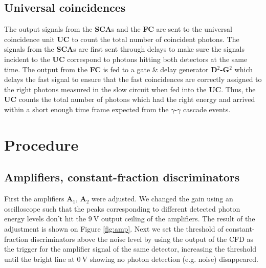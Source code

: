 \documentclass[twocolumn]{article}
\begin{document}
\subsection{Universal coincidences}
The output signals from the \textbf{SCA}s and the \textbf{FC} are sent to the universal coincidence unit \textbf{UC} to count the total number of coincident photons. The signals from the \textbf{SCA}s are first sent through delays to make sure the signals incident to the \textbf{UC} correspond to photons hitting both detectors at the same time. The output from the \textbf{FC} is fed to a gate $\&$ delay generator \textbf{D$^2$-G$^2$} which delays the fast signal to ensure that the fast coincidences are correctly assigned to the right photons measured in the slow circuit when fed into the \textbf{UC}. Thus, the \textbf{UC} counts the total number of photons which had the right energy and arrived within a short enough time frame expected from the $\gamma$-$\gamma$ cascade events.


\section{Procedure}
\subsection{Amplifiers, constant-fraction discriminators}
First the amplifiers \textbf{A$_1$}, \textbf{A$_2$} were adjusted. We changed the gain using an oscilloscope such that the peaks corresponding to different detected photon energy levels don't hit the $\SI{9}{\volt}$ output ceiling of the amplifiers. The result of the adjustment is shown on Figure \ref{fig:amp}. Next we set the threshold of constant-fraction discriminators above the noise level by using the output of the CFD as the trigger for the amplifier signal of the same detector, increasing the threshold until the bright line at $\SI{0}{\volt}$ showing no photon detection (e.g. noise) disappeared. 
\end{document}
